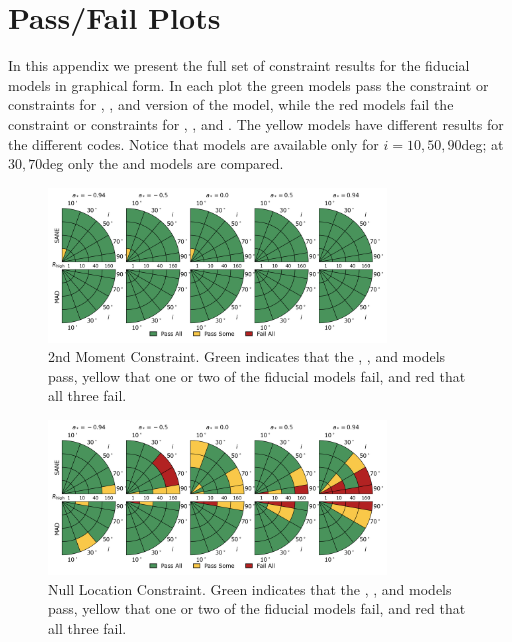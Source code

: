 \section{Pass/Fail Plots}\label{app:tables}

In this appendix we present the full set of constraint results for the fiducial models in graphical form.
In each plot the green models pass the constraint or constraints for \kharma, \bhac, and \hamr version of the model, while the red models fail the constraint or constraints for \kharma, \bhac, and \hamr.
The yellow models have different results for the different codes.
Notice that \hamr models are available only for $i = 10, 50, 90$deg; at $30, 70$deg only the \kharma and \bhac models are compared.


\begin{figure}
  \centering
  \includegraphics[width=0.8\textwidth]{./figures/230GHz_size_Constraints.png}
  \caption{2nd Moment Constraint.  Green indicates that the \kharma, \bhac, and \hamr models pass, yellow that one or two of the fiducial models fail, and red that all three fail.}
  \label{fig:230GHz_size_pizza}
\end{figure}

\begin{figure}
  \centering
  \includegraphics[width=0.8\textwidth]{./figures/Null_loc_Constraints.png}
  \caption{Null Location Constraint.  Green indicates that the \kharma, \bhac, and \hamr models pass, yellow that one or two of the fiducial models fail, and red that all three fail.}
  \label{fig:null_pizza}
\end{figure}

